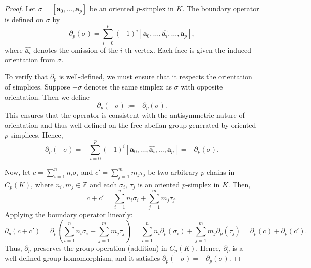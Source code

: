 \documentclass[12pt,oneside,reqno]{amsart}
\theoremstyle{plain}
\theoremstyle{definition}
\theoremstyle{remark}
\newcommand{\0}{{\textbf{0}}}
\begin{document}
\begin{proof}
Let $\sigma = [\mathbf{a}_0, \dots, \mathbf{a}_p]$ be an oriented $p$-simplex in $K$. The boundary operator is defined on $\sigma$ by
\[
\partial_p(\sigma) = \sum_{i=0}^{p} (-1)^i [\mathbf{a}_0, \dots, \widehat{\mathbf{a}_i}, \dots, \mathbf{a}_p],
\]
where $\widehat{\mathbf{a}_i}$ denotes the omission of the $i$-th vertex. Each face is given the induced orientation from $\sigma$.

To verify that $\partial_p$ is well-defined, we must ensure that it respects the orientation of simplices. Suppose $-\sigma$ denotes the same simplex as $\sigma$ with opposite orientation. Then we define
\[
\partial_p(-\sigma) := -\partial_p(\sigma).
\]
This ensures that the operator is consistent with the antisymmetric nature of orientation and thus well-defined on the free abelian group generated by oriented $p$-simplices. Hence,
\[
\partial_p(-\sigma) = - \sum_{i=0}^p (-1)^i [\mathbf{a}_0, \dots, \widehat{\mathbf{a}_i}, \dots, \mathbf{a}_p] = -\partial_p(\sigma).
\]

Now, let $c = \sum_{i=1}^n n_i \sigma_i$ and $c' = \sum_{j=1}^m m_j \tau_j$ be two arbitrary $p$-chains in $C_p(K)$, where $n_i, m_j \in \mathbb{Z}$ and each $\sigma_i$, $\tau_j$ is an oriented $p$-simplex in $K$. Then,
\[
c + c' = \sum_{i=1}^n n_i \sigma_i + \sum_{j=1}^m m_j \tau_j.
\]
Applying the boundary operator linearly:
\[
\partial_p(c + c') = \partial_p\left( \sum_{i=1}^n n_i \sigma_i + \sum_{j=1}^m m_j \tau_j \right)
= \sum_{i=1}^n n_i \partial_p(\sigma_i) + \sum_{j=1}^m m_j \partial_p(\tau_j)
= \partial_p(c) + \partial_p(c').
\]
Thus, $\partial_p$ preserves the group operation (addition) in $C_p(K)$. Hence, $\partial_p$ is a well-defined group homomorphism, and it satisfies $\partial_p(-\sigma) = -\partial_p(\sigma)$.
\end{proof}
\end{document}
